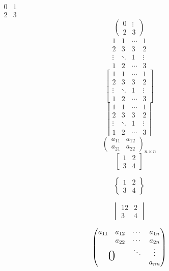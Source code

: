 \documentclass{ctexart}
\begin{document}
$ \begin{matrix}
0 & 1 \\
2 & 3
\end{matrix}
 $\qquad
$$ \begin{pmatrix}
0 & \vdots \\
2 & 3
\end{pmatrix}
 $$
 $$ \begin{array}{*{20}{c}}
 1&1& \cdots &1\\
 2&3&3&2\\
 \vdots & \ddots &1& \vdots \\
 1&2& \cdots &3
 \end{array} $$
 $$ \left[ {\begin{array}{*{20}{c}}
 	1&1& \cdots &1\\
 	2&3&3&2\\
 	\vdots & \ddots &1& \vdots \\
 	1&2& \cdots &3
 	\end{array}} \right] $$
 $$ \left| {\begin{array}{*{20}{c}}
 	1&1& \cdots &1\\
 	2&3&3&2\\
 	\vdots & \ddots &1& \vdots \\
 	1&2& \cdots &3
 	\end{array}} \right| $$
 $$ \left( {\begin{array}{*{20}{c}}
 	{{a_{11}}}&{{a_{12}}}\\
 	{{a_{21}}}&{{a_{22}}}
 	\end{array}} \right)_{n \times n} $$
$$\begin{bmatrix}
	1 & 2 \\
	3 & 4
\end{bmatrix}$$

$$\begin{Bmatrix}
1 & 2 \\
3 & 4
\end{Bmatrix}$$

 $$\begin{vmatrix}
 	12 & 2 \\
 	3 & 4
 \end{vmatrix}$$

\[\begin{pmatrix}
a_{11} & a_{12}&\cdots&a_{1n} \\
&a_{22}& \cdots &a_{2n} \\
&     & \ddots & \vdots\\
\multicolumn{2}{c}{\raisebox{1.3ex}[0pt]{\huge 0}}
&    &a_{nn}
\end{pmatrix}\]
\end{document}
